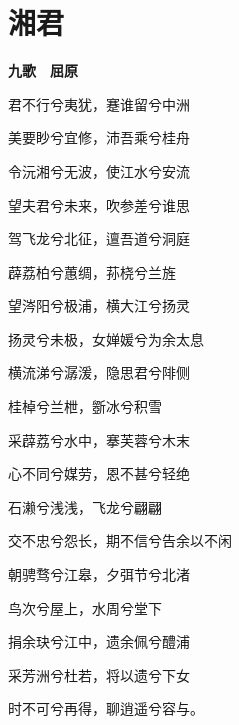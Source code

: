 \documentclass[12pt,a4paper]{ctexbook}
\begin{document}
\section{湘君}
\textbf{九歌　屈原}\par\vspace{0.5em}
君不行兮夷犹，蹇谁留兮中洲\par
美要眇兮宜修，沛吾乘兮桂舟\par
令沅湘兮无波，使江水兮安流\par
望夫君兮未来，吹参差兮谁思\par
驾飞龙兮北征，邅吾道兮洞庭\par
薜荔柏兮蕙绸，荪桡兮兰旌\par
望涔阳兮极浦，横大江兮扬灵\par
扬灵兮未极，女婵媛兮为余太息\par
横流涕兮潺湲，隐思君兮陫侧\par
桂棹兮兰枻，斵冰兮积雪\par
采薜荔兮水中，搴芙蓉兮木末\par
心不同兮媒劳，恩不甚兮轻绝\par
石濑兮浅浅，飞龙兮翩翩\par
交不忠兮怨长，期不信兮告余以不闲\par
朝骋骛兮江皋，夕弭节兮北渚\par
鸟次兮屋上，水周兮堂下\par
捐余玦兮江中，遗余佩兮醴浦\par
采芳洲兮杜若，将以遗兮下女\par
时不可兮再得，聊逍遥兮容与。\par
\end{document}
